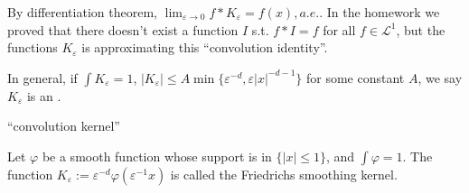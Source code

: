By differentiation theorem, $\lim_{\varepsilon\to 0}f*K_\varepsilon = f(x), a.e.$.
In the homework we proved that there doesn't exist a function $I$ s.t.
$f*I=f$ for all $f\in \mathcal{L}^1$, but the functions $K_\varepsilon$
is approximating this ``convolution identity''.

\begin{definition}
	In general, if $\int K_\varepsilon =1$,
	$|K_\varepsilon|\le A\min\{\varepsilon^{-d},\varepsilon |x|^{-d-1}\}$
	for some constant $A$,
	we say $K_\varepsilon$ is an .
\end{definition}

``convolution kernel''

Let $\varphi$ be a smooth function whose support is in  $\{|x|\le 1\}$,
and $\int \varphi = 1$.
The function  $K_\varepsilon := \varepsilon^{-d}\varphi(\varepsilon^{-1}x)$
is called the Friedrichs smoothing kernel.


